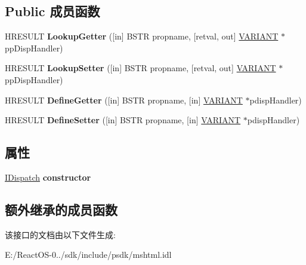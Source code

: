 \subsection*{Public 成员函数}
\begin{DoxyCompactItemize}
\item 
\mbox{\label{interface_m_s_h_t_m_l_1_1_i_h_t_m_l_d_o_m_constructor_a1ec573e09472c4aaec313e755b025b20}} 
H\+R\+E\+S\+U\+LT {\bfseries Lookup\+Getter} (\mbox{[}in\mbox{]} B\+S\+TR propname, \mbox{[}retval, out\mbox{]} \hyperlink{structtag_v_a_r_i_a_n_t}{V\+A\+R\+I\+A\+NT} $\ast$pp\+Disp\+Handler)
\item 
\mbox{\label{interface_m_s_h_t_m_l_1_1_i_h_t_m_l_d_o_m_constructor_a17bc46fe225e95159fe3f60a9fa6f5d7}} 
H\+R\+E\+S\+U\+LT {\bfseries Lookup\+Setter} (\mbox{[}in\mbox{]} B\+S\+TR propname, \mbox{[}retval, out\mbox{]} \hyperlink{structtag_v_a_r_i_a_n_t}{V\+A\+R\+I\+A\+NT} $\ast$pp\+Disp\+Handler)
\item 
\mbox{\label{interface_m_s_h_t_m_l_1_1_i_h_t_m_l_d_o_m_constructor_a31e72fcc195c56833c11a8d12cc222c5}} 
H\+R\+E\+S\+U\+LT {\bfseries Define\+Getter} (\mbox{[}in\mbox{]} B\+S\+TR propname, \mbox{[}in\mbox{]} \hyperlink{structtag_v_a_r_i_a_n_t}{V\+A\+R\+I\+A\+NT} $\ast$pdisp\+Handler)
\item 
\mbox{\label{interface_m_s_h_t_m_l_1_1_i_h_t_m_l_d_o_m_constructor_afc4950e56300c634b8858ffeffe7a9c1}} 
H\+R\+E\+S\+U\+LT {\bfseries Define\+Setter} (\mbox{[}in\mbox{]} B\+S\+TR propname, \mbox{[}in\mbox{]} \hyperlink{structtag_v_a_r_i_a_n_t}{V\+A\+R\+I\+A\+NT} $\ast$pdisp\+Handler)
\end{DoxyCompactItemize}
\subsection*{属性}
\begin{DoxyCompactItemize}
\item 
\mbox{\label{interface_m_s_h_t_m_l_1_1_i_h_t_m_l_d_o_m_constructor_adc1f1f64755b8e4e49b0f201c6d76fc5}} 
\hyperlink{interface_i_dispatch}{I\+Dispatch} {\bfseries constructor}
\end{DoxyCompactItemize}
\subsection*{额外继承的成员函数}


该接口的文档由以下文件生成\+:\begin{DoxyCompactItemize}
\item 
E\+:/\+React\+O\+S-\/0../sdk/include/psdk/mshtml.\+idl\end{DoxyCompactItemize}
